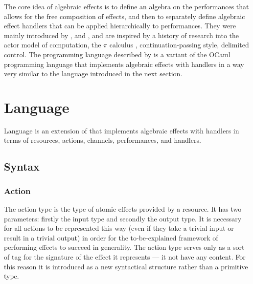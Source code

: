 The core idea of algebraic effects is to define an algebra on the performances that allows for the free composition of effects, and then to separately define algebraic effect handlers that can be applied hierarchically to performances.
They were mainly introduced by \cite{Plotkin200101}, \cite{Plotkin2009} and \cite{Bauer2013},
and are inspired by a history of research into the actor model of computation, the $\pi$ calculus \cite{Milner1999}, continuation-passing style, delimited control.
The  programming language described by \cite{Bauer2015ProgrammingWA} is a variant of the OCaml programming language that implements algebraic effects with handlers in a way very similar to the language \LangD introduced in the next section.

\newpage
\section{Language \LangD}
\label{sec:LangD}

Language \LangD is an extension of \LangA that implements algebraic effects with handlers in terms of resources, actions, channels, performances, and handlers.

\subsection{Syntax}



\subsubsection{Action}

The action type is the type of atomic effects provided by a resource.
It has two parameters: firstly the input type and secondly the output type.
It is necessary for all actions to be represented this way
(even if they take a trivial input or result in a trivial output)
in order for the to-be-explained framework of performing effects to succeed in generality.
The action type serves only as a sort of tag for the signature of the effect it represents --- it not have any content.
For this reason it is introduced as a new syntactical structure rather than a primitive type.

